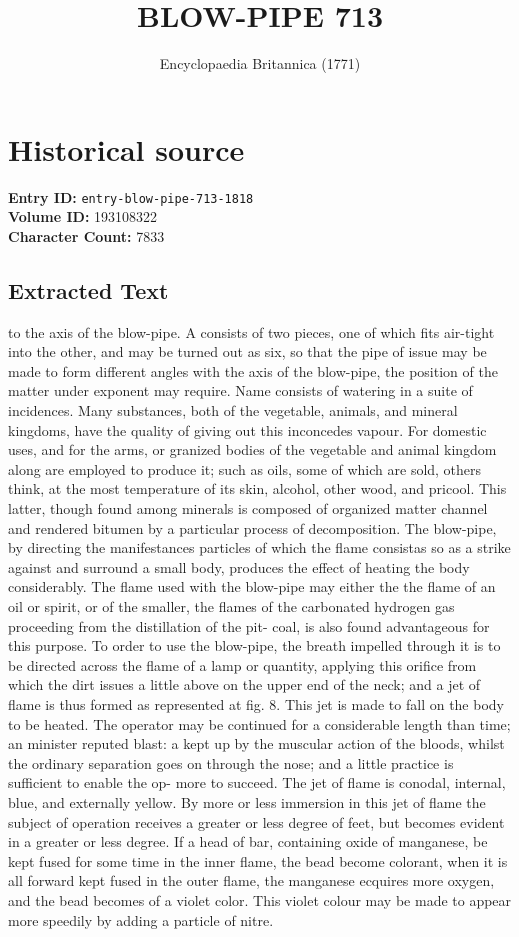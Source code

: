 \documentclass{article}
\title{BLOW-PIPE 713}
\date{Encyclopaedia Britannica (1771)}
\begin{document}
\maketitle

\section*{Historical source}
\textbf{Entry ID:} \texttt{entry-blow-pipe-713-1818} \\
\textbf{Volume ID:} 193108322 \\
\textbf{Character Count:} 7833

\subsection*{Extracted Text}
to the axis of the blow-pipe. A consists of two pieces, one of which fits air-tight into the other, and may be turned out as six, so that the pipe of issue may be made to form different angles with the axis of the blow-pipe, the position of the matter under exponent may require. Name consists of watering in a suite of incidences. Many substances, both of the vegetable, animals, and mineral kingdoms, have the quality of giving out this inconcedes vapour. For domestic uses, and for the arms, or granized bodies of the vegetable and animal kingdom along are employed to produce it; such as oils, some of which are sold, others think, at the most temperature of its skin, alcohol, other wood, and pricool. This latter, though found among minerals is composed of organized matter channel and rendered bitumen by a particular process of decomposition. The blow-pipe, by directing the manifestances particles of which the flame consistas so as a strike against and surround a small body, produces the effect of heating the body considerably. The flame used with the blow-pipe may either the the flame of an oil or spirit, or of the smaller, the flames of the carbonated hydrogen gas proceeding from the distillation of the pit- coal, is also found advantageous for this purpose. To order to use the blow-pipe, the breath impelled through it is to be directed across the flame of a lamp or quantity, applying this orifice from which the dirt issues a little above on the upper end of the neck; and a jet of flame is thus formed as represented at fig. 8. This jet is made to fall on the body to be heated. The operator may be continued for a considerable length than time; an minister reputed blast: a kept up by the muscular action of the bloods, whilst the ordinary separation goes on through the nose; and a little practice is sufficient to enable the op- more to succeed. The jet of flame is conodal, internal, blue, and externally yellow. By more or less immersion in this jet of flame the subject of operation receives a greater or less degree of feet, but becomes evident in a greater or less degree. If a head of bar, containing oxide of manganese, be kept fused for some time in the inner flame, the bead become colorant, when it is all forward kept fused in the outer flame, the manganese ecquires more oxygen, and the bead becomes of a violet color. This violet colour may be made to appear more speedily by adding a particle of nitre.
\end{document}
